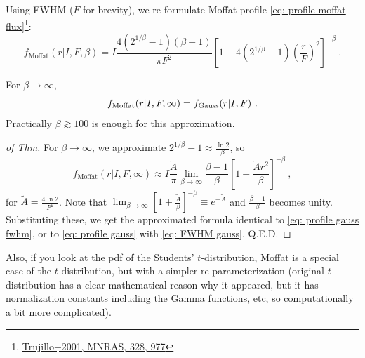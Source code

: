Using FWHM ($ F $ for brevity), we re-formulate Moffat profile \cref{eq: profile moffat flux}\footnote{\href{https://ui.adsabs.harvard.edu/abs/2001MNRAS.328..977T/abstract}{Trujillo+2001, MNRAS, 328, 977}}:
\begin{equation}\label{eq: profile moffat fwhm}
  f_\mathrm{Moffat}(r|I, F, \beta)
    = I \frac{4(2^{1/\beta} - 1) (\beta - 1)}{\pi F^2}
      \left [ 1 + 4(2^{1/\beta} - 1) \left ( \frac{r}{F} \right )^2 \right ]^{-\beta} ~.
\end{equation}

\begin{thm}
For $ \beta \rightarrow \infty $,
\begin{equation}
  f_{\rm Moffat} (r|I, F, \infty) = f_{\rm Gauss}(r|I, F) ~.
\end{equation}
Practically $ \beta \gtrsim 100 $ is enough for this approximation.
\end{thm}
\begin{proof}[of Thm]
For $ \beta \rightarrow \infty $, we approximate $ 2^{1/\beta} - 1 \approx \frac{\ln 2}{\beta} $, so
\begin{equation*}
  f_\mathrm{Moffat}(r|I, F, \infty)
    \approx I \frac{\tilde{A}}{\pi} 
      \lim_{\beta \rightarrow \infty} \frac{\beta-1}{\beta} 
      \left [ 1 + \frac{\tilde{A} r^2}{\beta} \right ]^{-\beta} ~,
\end{equation*}
for $ \tilde{A} = \frac{4 \ln 2}{F^2} $. Note that $ \lim_{\beta \rightarrow \infty} \left [ 1 + \frac{\tilde{A}}{\beta} \right ]^{-\beta} \equiv e^{-\tilde{A}} $ and $ \frac{\beta-1}{\beta} $ becomes unity. Substituting these, we get the approximated formula identical to \cref{eq: profile gauss fwhm}, or to \cref{eq: profile gauss} with \cref{eq: FWHM gauss}. Q.E.D.
\end{proof}

Also, if you look at the pdf of the Students' $ t $-distribution, Moffat is a special case of the $ t $-distribution, but with a simpler re-parameterization (original $ t $-distribution has a clear mathematical reason why it appeared, but it has normalization constants including the Gamma functions, etc, so computationally a bit more complicated). 

